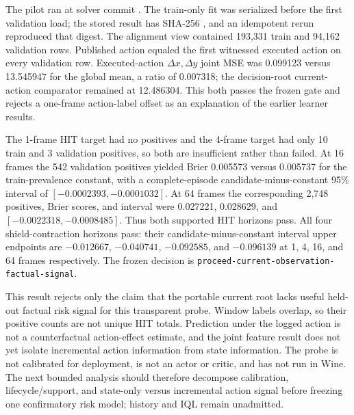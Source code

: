 \documentclass[11pt]{article}
\begin{document}
The pilot ran at solver commit
.  The train-only fit was
serialized before the first validation load; the stored result has SHA-256
,
and an idempotent rerun reproduced that digest.  The alignment view contained
193,331 train and 94,162 validation rows.  Published action equaled the first
witnessed executed action on every validation row.  Executed-action
$\Delta x,\Delta y$ joint MSE was 0.099123 versus 13.545947 for the global
mean, a ratio of 0.007318; the decision-root current-action comparator remained
at 12.486304.  This both passes the frozen gate and rejects a one-frame
action-label offset as an explanation of the earlier learner results.

The 1-frame HIT target had no positives and the 4-frame target had only 10
train and 3 validation positives, so both are insufficient rather than failed.
At 16 frames the 542 validation positives yielded Brier 0.005573 versus
0.005737 for the train-prevalence constant, with a complete-episode
candidate-minus-constant 95\% interval of
$[-0.0002393,-0.0001032]$.  At 64 frames the corresponding 2,748 positives,
Brier scores, and interval were 0.027221, 0.028629, and
$[-0.0022318,-0.0008485]$.  Thus both supported HIT horizons pass.  All four
shield-contraction horizons pass: their candidate-minus-constant interval
upper endpoints are $-0.012667$, $-0.040741$, $-0.092585$, and $-0.096139$
at 1, 4, 16, and 64 frames respectively.  The frozen decision is
\texttt{proceed-current-observation-factual-signal}.

This result rejects only the claim that the portable current root lacks useful
held-out factual risk signal for this transparent probe.  Window labels
overlap, so their positive counts are not unique HIT totals.  Prediction under
the logged action is not a counterfactual action-effect estimate, and the
joint feature result does not yet isolate incremental action information from
state information.  The probe is not calibrated for deployment, is not an
actor or critic, and has not run in Wine.  The next bounded analysis should
therefore decompose calibration, lifecycle/support, and state-only versus
incremental action signal before freezing one confirmatory risk model; history
and IQL remain unadmitted.
\end{document}

